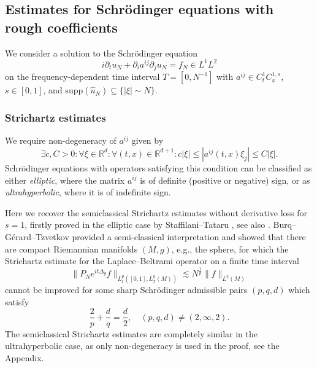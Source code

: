 \documentclass{amsart}
\theoremstyle{definition}
\newcommand{\R}{\mathbb{R}}
\begin{document}
\subsection{Estimates for Schr\"odinger equations with rough coefficients}

We consider a solution to the Schr\"odinger equation
\begin{equation}
\label{eq:FrequencyDependentSchroedinger}
i \partial_t u_N + \partial_i a^{ij} \partial_j u_N = f_N \in L^1 L^2
\end{equation}
on the frequency-dependent time interval $T=[0,N^{-1}]$ with $a^{ij} \in C^1_t C_x^{1,s}$, $s \in [0,1]$, and $\text{supp}(\hat{u}_N) \subseteq \{ |\xi| \sim N \}$. 

\subsubsection{Strichartz estimates}
We require non-degeneracy of $a^{ij}$ given by
\begin{equation}
\label{eq:UniformNondegeneracy}
\exists c, C > 0: \forall \xi \in \R^d: \forall (t,x) \in \R^{d+1}: c |\xi| \leq |a^{ij}(t,x) \xi_j| \leq C |\xi|.
\end{equation}
Schr\"odinger equations with operators satisfying this condition can be classified
as either \emph{elliptic}, where the matrix $a^{ij}$ is of definite (positive or negative) 
sign, or  as \emph{ultrahyperbolic}, where it is of indefinite sign. 

\normalsize

Here we recover the semiclassical Strichartz estimates without derivative loss for $s=1$, firstly proved in the elliptic case by Staffilani--Tataru \cite{StaffilaniTataru2002}, see also \cite{Tataru2008}.  Burq--G\'erard--Tzvetkov \cite{BurqGerardTzvetkov2004} provided a semi-classical interpretation and showed that there are compact Riemannian manifolds $(M,g)$, e.g., the sphere, for which the Strichartz estimate for the Laplace--Beltrami operator on a finite time interval
\begin{equation*}
\| P_N e^{it \Delta_g} f \|_{L_t^p([0,1], L^q_x(M))} \lesssim N^{\frac{1}{p}} \| f \|_{L^2(M)}
\end{equation*}
cannot be improved for some sharp Schr\"odinger admissible pairs $(p,q,d)$ which satisfy
\begin{equation*}
\frac{2}{p} + \frac{d}{q} = \frac{d}{2}, \quad (p,q,d) \neq (2,\infty,2).
\end{equation*}
The semiclassical Strichartz estimates are  completely similar in the ultrahyperbolic case, as only non-degeneracy is used in the proof, see the Appendix.
\end{document}
